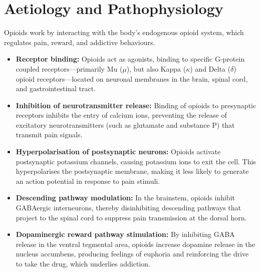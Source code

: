 \section*{Aetiology and Pathophysiology}
Opioids work by interacting with the body's endogenous opioid system, which regulates pain, reward, and addictive behaviours.
\begin{itemize}
    \item \textbf{Receptor binding:} Opioids act as agonists, binding to specific G-protein coupled receptors—primarily Mu ($\mu$), but also Kappa ($\kappa$) and Delta ($\delta$) opioid receptors—located on neuronal membranes in the brain, spinal cord, and gastrointestinal tract.
    \item \textbf{Inhibition of neurotransmitter release:} Binding of opioids to presynaptic receptors inhibits the entry of calcium ions, preventing the release of excitatory neurotransmitters (such as glutamate and substance P) that transmit pain signals.
    \item \textbf{Hyperpolarisation of postsynaptic neurons:} Opioids activate postsynaptic potassium channels, causing potassium ions to exit the cell. This hyperpolarises the postsynaptic membrane, making it less likely to generate an action potential in response to pain stimuli.
    \item \textbf{Descending pathway modulation:} In the brainstem, opioids inhibit GABAergic interneurons, thereby disinhibiting descending pathways that project to the spinal cord to suppress pain transmission at the dorsal horn.
    \item \textbf{Dopaminergic reward pathway stimulation:} By inhibiting GABA release in the ventral tegmental area, opioids increase dopamine release in the nucleus accumbens, producing feelings of euphoria and reinforcing the drive to take the drug, which underlies addiction.
\end{itemize}

